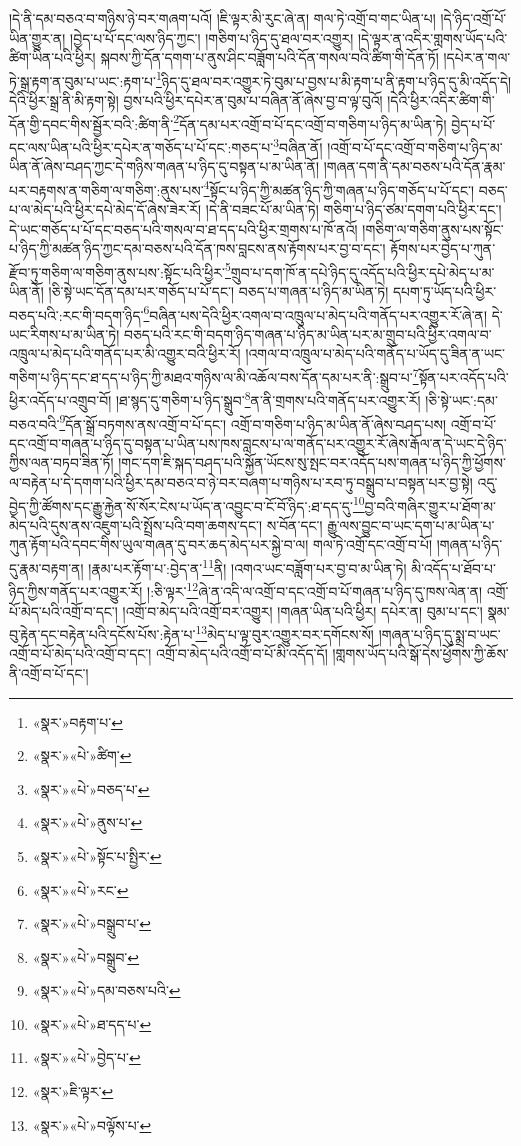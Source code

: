 །དེ་ནི་དམ་བཅའ་བ་གཉིས་ཉེ་བར་གཞག་པའོ། །ཇི་ལྟར་མི་རུང་ཞེ་ན། གལ་ཏེ་འགྲོ་བ་གང་ཡིན་པ། །དེ་ཉིད་འགྲོ་པོ་ཡིན་གྱུར་ན། །བྱེད་པ་པོ་དང་ལས་ཉིད་ཀྱང་། །གཅིག་པ་ཉིད་དུ་ཐལ་བར་འགྱུར། །དེ་ལྟར་ན་འདིར་གླགས་ཡོད་པའི་ཚིག་ཡིན་པའི་ཕྱིར། སྐབས་ཀྱི་དོན་དགག་པ་ནུས་ཤིང་བཟློག་པའི་དོན་གསལ་བའི་ཚིག་གི་དོན་ཏོ། །དཔེར་ན་གལ་ཏེ་སྒྲ་རྟག་ན་བུམ་པ་ཡང་:རྟག་པ་\footnote{«སྣར་»བརྟག་པ་}ཉིད་དུ་ཐལ་བར་འགྱུར་ཏེ་བུམ་པ་བྱས་པ་མི་རྟག་པ་ནི་རྟག་པ་ཉིད་དུ་མི་འདོད་དེ། དེའི་ཕྱིར་སྒྲ་ནི་མི་རྟག་སྟེ། བྱས་པའི་ཕྱིར་དཔེར་ན་བུམ་པ་བཞིན་ནོ་ཞེས་བྱ་བ་ལྟ་བུའོ། །དེའི་ཕྱིར་འདིར་ཚིག་གི་དོན་གྱི་དབང་གིས་སྦྱོར་བའི་:ཚིག་ནི་\footnote{«སྣར་»«པེ་»ཚིག་}དོན་དམ་པར་འགྲོ་བ་པོ་དང་འགྲོ་བ་གཅིག་པ་ཉིད་མ་ཡིན་ཏེ། བྱེད་པ་པོ་དང་ལས་ཡིན་པའི་ཕྱིར་དཔེར་ན་གཅོད་པ་པོ་དང་:གཅད་པ་\footnote{«སྣར་»«པེ་»བཅད་པ་}བཞིན་ནོ། །འགྲོ་བ་པོ་དང་འགྲོ་བ་གཅིག་པ་ཉིད་མ་ཡིན་ནོ་ཞེས་བཤད་ཀྱང་དེ་གཉིས་གཞན་པ་ཉིད་དུ་བསྟན་པ་མ་ཡིན་ནོ། །གཞན་དག་ནི་དམ་བཅས་པའི་དོན་རྣམ་པར་བརྟགས་ན་གཅིག་ལ་གཅིག་:ནུས་པས་\footnote{«སྣར་»«པེ་»ནུས་པ་}སྟོང་པ་ཉིད་ཀྱི་མཚན་ཉིད་ཀྱི་གཞན་པ་ཉིད་གཅོད་པ་པོ་དང་། བཅད་པ་ལ་མེད་པའི་ཕྱིར་དཔེ་མེད་དོ་ཞེས་ཟེར་རོ། །དེ་ནི་བཟང་པོ་མ་ཡིན་ཏེ། གཅིག་པ་ཉིད་ཙམ་དགག་པའི་ཕྱིར་དང་། དེ་ཡང་གཅོད་པ་པོ་དང་བཅད་པའི་གསལ་བ་ཐ་དད་པའི་ཕྱིར་གྲགས་པ་ཁོ་ནའོ། །གཅིག་ལ་གཅིག་ནུས་པས་སྟོང་པ་ཉིད་ཀྱི་མཚན་ཉིད་ཀྱང་དམ་བཅས་པའི་དོན་ཁས་བླངས་ནས་རྟོགས་པར་བྱ་བ་དང་། རྟོགས་པར་བྱེད་པ་ཀུན་རྫོབ་ཏུ་གཅིག་ལ་གཅིག་ནུས་པས་:སྟོང་པའི་ཕྱིར་\footnote{«སྣར་»«པེ་»སྟོང་པ་སྤྱིར་}གྲུབ་པ་དག་ཁོ་ན་དཔེ་ཉིད་དུ་འདོད་པའི་ཕྱིར་དཔེ་མེད་པ་མ་ཡིན་ནོ། །ཅི་སྟེ་ཡང་དོན་དམ་པར་གཅོད་པ་པོ་དང་། བཅད་པ་གཞན་པ་ཉིད་མ་ཡིན་ཏེ། དཔག་ཏུ་ཡོད་པའི་ཕྱིར་བཅད་པའི་:རང་གི་བདག་ཉིད་\footnote{«སྣར་»«པེ་»རང་}བཞིན་པས་དེའི་ཕྱིར་འགལ་བ་འཁྲུལ་པ་མེད་པའི་གནོད་པར་འགྱུར་རོ་ཞེ་ན། དེ་ཡང་རིགས་པ་མ་ཡིན་ཏེ། བཅད་པའི་རང་གི་བདག་ཉིད་གཞན་པ་ཉིད་མ་ཡིན་པར་མ་གྲུབ་པའི་ཕྱིར་འགལ་བ་འཁྲུལ་པ་མེད་པའི་གནོད་པར་མི་འགྱུར་བའི་ཕྱིར་རོ། །འགལ་བ་འཁྲུལ་པ་མེད་པའི་གནོད་པ་ཡོད་དུ་ཟིན་ན་ཡང་གཅིག་པ་ཉིད་དང་ཐ་དད་པ་ཉིད་ཀྱི་མཐའ་གཉིས་ལ་མི་འཆོལ་བས་དོན་དམ་པར་ནི་:སྒྲུབ་པ་\footnote{«སྣར་»«པེ་»བསྒྲུབ་པ་}སྟོན་པར་འདོད་པའི་ཕྱིར་འདོད་པ་འགྲུབ་བོ། །ཐ་སྙད་དུ་གཅིག་པ་ཉིད་སྒྲུབ་\footnote{«སྣར་»«པེ་»བསྒྲུབ་}ན་ནི་གྲགས་པའི་གནོད་པར་འགྱུར་རོ། །ཅི་སྟེ་ཡང་:དམ་བཅའ་བའི་\footnote{«སྣར་»«པེ་»དམ་བཅས་པའི་}དོན་སྒྲོ་བཏགས་ནས་འགྲོ་བ་པོ་དང་། འགྲོ་བ་གཅིག་པ་ཉིད་མ་ཡིན་ནོ་ཞེས་བཤད་པས། འགྲོ་བ་པོ་དང་འགྲོ་བ་གཞན་པ་ཉིད་དུ་བསྟན་པ་ཡིན་པས་ཁས་བླངས་པ་ལ་གནོད་པར་འགྱུར་རོ་ཞེས་རྒོལ་ན་དེ་ཡང་དེ་ཉིད་ཀྱིས་ལན་བཏབ་ཟིན་ཏོ། །གང་དག་ཇི་སྐད་བཤད་པའི་སྐྱོན་ཡོངས་སུ་སྤང་བར་འདོད་པས་གཞན་པ་ཉིད་ཀྱི་ཕྱོགས་ལ་བརྟེན་པ་དེ་དགག་པའི་ཕྱིར་དམ་བཅའ་བ་ཉེ་བར་བཞག་པ་གཉིས་པ་རབ་ཏུ་བསྒྲུབ་པ་བསྟན་པར་བྱ་སྟེ། འདུ་བྱེད་ཀྱི་ཚོགས་དང་རྒྱུ་རྐྱེན་སོ་སོར་ངེས་པ་ཡོད་ན་འབྱུང་བ་ངོ་བོ་ཉིད་:ཐ་དད་དུ་\footnote{«སྣར་»«པེ་»ཐ་དད་པ་}བྱ་བའི་གཞིར་གྱུར་པ་ཐོག་མ་མེད་པའི་དུས་ནས་འཇུག་པའི་སྤྲོས་པའི་བག་ཆགས་དང་། ས་བོན་དང་། རྒྱུ་ལས་བྱུང་བ་ཡང་དག་པ་མ་ཡིན་པ་ཀུན་རྟོག་པའི་དབང་གིས་ཡུལ་གཞན་དུ་བར་ཆད་མེད་པར་སྐྱེ་བ་ལ། གལ་ཏེ་འགྲོ་དང་འགྲོ་བ་པོ། །གཞན་པ་ཉིད་དུ་རྣམ་བརྟག་ན། །རྣམ་པར་རྟོག་པ་:བྱེད་ན་\footnote{«སྣར་»«པེ་»བྱེད་པ་}ནི། །འགའ་ཡང་བཟློག་པར་བྱ་བ་མ་ཡིན་ཏེ། མི་འདོད་པ་ཐོབ་པ་ཉིད་ཀྱིས་གནོད་པར་འགྱུར་རོ། །:ཅི་ལྟར་\footnote{«སྣར་»ཇི་ལྟར་}ཞེ་ན་འདི་ལ་འགྲོ་བ་དང་འགྲོ་བ་པོ་གཞན་པ་ཉིད་དུ་ཁས་ལེན་ན། འགྲོ་པོ་མེད་པའི་འགྲོ་བ་དང་། །འགྲོ་བ་མེད་པའི་འགྲོ་བར་འགྱུར། །གཞན་ཡིན་པའི་ཕྱིར། དཔེར་ན། བུམ་པ་དང་། སྣམ་བུ་རྟེན་དང་བརྟེན་པའི་དངོས་པོས་:རྟེན་པ་\footnote{«སྣར་»«པེ་»བལྟོས་པ་}མེད་པ་ལྟ་བུར་འགྱུར་བར་དགོངས་སོ། །གཞན་པ་ཉིད་དུ་སྨྲ་བ་ཡང་འགྲོ་བ་པོ་མེད་པའི་འགྲོ་བ་དང་། འགྲོ་བ་མེད་པའི་འགྲོ་བ་པོ་མི་འདོད་དོ། །གླགས་ཡོད་པའི་སྒོ་དེས་ཕྱོགས་ཀྱི་ཆོས་ནི་འགྲོ་བ་པོ་དང་། 